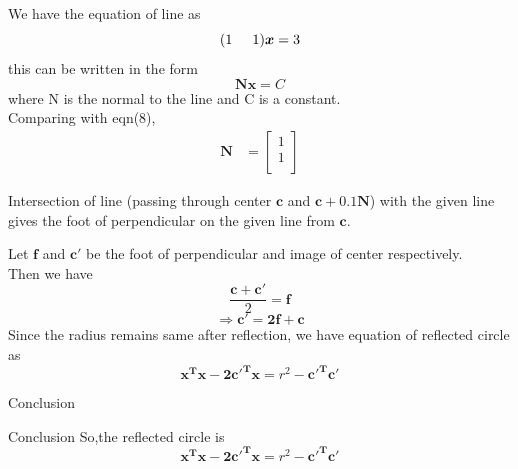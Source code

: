 \documentclass{beamer}
\begin{document}
\begin{frame}
\begin{solution}
We have the equation of line as
\begin{equation}
    (1\hspace{5mm} 1)\boldsymbol{x} = 3
\end{equation}
this can be written in the form
\begin{equation}
    \boldsymbol{Nx = } C
\end{equation}
where N is the normal to the line and C is a constant.\\
Comparing with eqn(8),\\
\begin{align}
    \boldsymbol{N} &= \begin{bmatrix}
           1 \\
           1 \\
         \end{bmatrix}
\end{align}

Intersection of line (passing through center $\boldsymbol{c}$ and $\boldsymbol{c + 0.1N}$) with the given line gives the foot of perpendicular on the given line from $\boldsymbol{c}$.\\
\end{solution}
\end{frame}

\begin{frame}
\begin{solution}
Let $\boldsymbol{f}$ and $\boldsymbol{c'}$ be the foot of perpendicular and image of center respectively.\\
Then we have 
\begin{equation}
    \frac{\boldsymbol{c+c'}}{2} = \boldsymbol{f}
\end{equation}
\begin{equation}
    \Rightarrow \boldsymbol{c' = 2f + c}
\end{equation}
Since the radius remains same after reflection, we have equation of reflected circle as 
\begin{equation}
    \boldsymbol{x^Tx - 2c'^Tx} = r^2 - \boldsymbol{c'^Tc'}
\end{equation}
\end{solution}
\end{frame}
\begin{frame}{Conclusion}
\begin{block}{Conclusion}
So,the reflected circle is\\
\begin{equation}
    \boldsymbol{x^Tx - 2c'^Tx} = r^2 - \boldsymbol{c'^Tc'}
\end{equation}
\end{block}
\end{frame}
\end{document}
